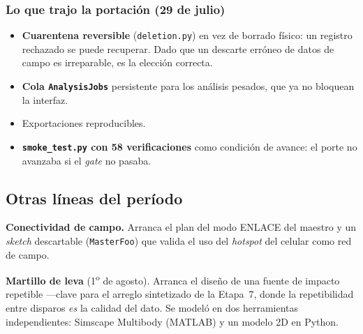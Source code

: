 
\subsubsection{Lo que trajo la portaci\'on (29 de julio)}

\begin{itemize}[itemsep=0.2em]
\item \textbf{Cuarentena reversible} (\texttt{deletion.py}) en vez de borrado
f\'isico: un registro rechazado se puede recuperar. Dado que un descarte
err\'oneo de datos de campo es irreparable, es la elecci\'on correcta.
\item \textbf{Cola \texttt{AnalysisJobs}} persistente para los an\'alisis
pesados, que ya no bloquean la interfaz.
\item Exportaciones reproducibles.
\item \textbf{\texttt{smoke\_test.py} con 58 verificaciones} como condici\'on de
avance: el porte no avanzaba si el \emph{gate} no pasaba.
\end{itemize}

\subsection{Otras l\'ineas del per\'iodo}

\textbf{Conectividad de campo.} Arranca el plan del modo ENLACE del maestro y
un \emph{sketch} descartable (\texttt{MasterFoo}) que valida el uso del
\emph{hotspot} del celular como red de campo.


\textbf{Martillo de leva} (1\textsuperscript{o} de agosto). Arranca el dise\~no
de una fuente de impacto repetible ---clave para el arreglo sintetizado de la
Etapa~7, donde la repetibilidad entre disparos \emph{es} la
calidad del dato. Se model\'o en dos herramientas independientes: Simscape
Multibody (MATLAB) y un modelo 2D en Python.

